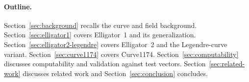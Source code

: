 \paragraph{Outline.}
Section~\ref{sec:background} recalls the curve and field background.
Section~\ref{sec:elligator1} covers Elligator~1 and its
generalization. Section~\ref{sec:elligator2-legendre} covers
Elligator~2 and the Legendre-curve variant.
Section~\ref{sec:curve1174} covers Curve1174.
Section~\ref{sec:computability} discusses computability and
validation against test vectors. Section~\ref{sec:related-work}
discusses related work and Section~\ref{sec:conclusion} concludes.

